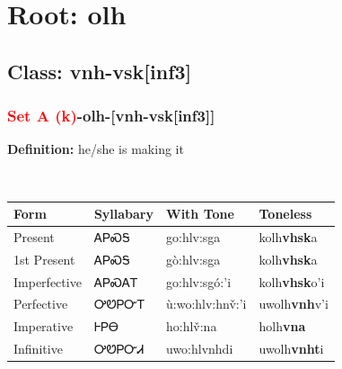 \needspace{4in}
\section*{Root: olh}
\nopagebreak
{}
\needspace{3in}
\subsection*{Class: vnh-vsk[inf3]}
\nopagebreak
\needspace{2in}
\subsubsection*{\textcolor{Red}{Set A (k)}{-}\textbf{olh}{-}[vnh-vsk[inf3]]}
\nopagebreak
\textbf{Definition: } he/she is making it
\\[0.5em]
\begin{tabularx}{\textwidth}{l X X X}%
\toprule%
\textbf{Form}&\textbf{Syllabary}&\textbf{With Tone}&\textbf{Toneless}\\%
\midrule%
Present&ᎪᏢᏍᎦ&go:hlv:sga&kolh\textbf{vhsk}a\\%
1st Present&ᎪᏢᏍᎦ&gò:hlv:sga&kolh\textbf{vhsk}a\\%
Imperfective&ᎪᏢᏍᎪᎢ&go:hlv:sgó:’i&kolh\textbf{vhsk}o'i\\%
Perfective&ᎤᏬᏢᏅᎢ&ù:wo:hlv:hnv̌:’i&uwolh\textbf{vnh}v'i\\%
Imperative&ᎰᏢᎾ&ho:hlv̌:na&holh\textbf{vna}\\%
Infinitive&ᎤᏬᏢᏅᏗ&uwo:hlvnhdi&uwolh\textbf{vnht}i\\%
\bottomrule%
\end{tabularx}
\\[1em]